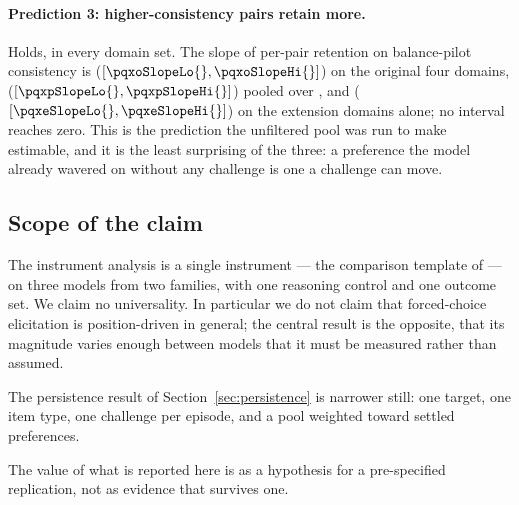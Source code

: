 \paragraph{Prediction 3: higher-consistency pairs retain more.} Holds, in every domain
set. The slope of per-pair retention on balance-pilot consistency is \pqxoSlope{}
(\([\pqxoSlopeLo{}, \pqxoSlopeHi{}]\)) on the original four domains, \pqxpSlope{}
(\([\pqxpSlopeLo{}, \pqxpSlopeHi{}]\)) pooled over \pqxNPooledDomains{}, and
\pqxeSlope{} (\([\pqxeSlopeLo{}, \pqxeSlopeHi{}]\)) on the extension domains alone; no
interval reaches zero. This is the prediction the unfiltered pool was run to make
estimable, and it is the least surprising of the three: a preference the model already
wavered on without any challenge is one a challenge can move.

\subsection{Scope of the claim}
\label{sec:scope}

The instrument analysis is a single instrument --- the comparison template of
\citet{mazeika2025utility} --- on three models from two families, with one reasoning
control and one outcome set. We claim no universality. In particular we do not claim that
forced-choice elicitation is position-driven in general; the central result is the
opposite, that its magnitude varies enough between models that it must be measured rather
than assumed.

The persistence result of Section~\ref{sec:persistence} is narrower still: one target,
one item type, one challenge per episode, and a pool weighted toward settled preferences.

The value of what is reported here is as a hypothesis for a pre-specified replication,
not as evidence that survives one.
